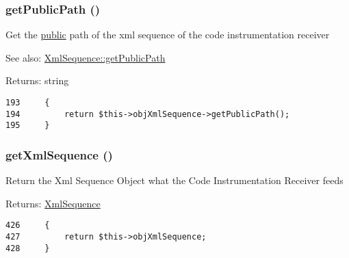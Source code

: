 \hypertarget{class_code_instrumentation_receiver_74df99a19bc54d630a15e1778144eb31}{
\subsubsection[{getPublicPath}]{\setlength{\rightskip}{0pt plus 5cm}getPublicPath ()}}
\label{class_code_instrumentation_receiver_74df99a19bc54d630a15e1778144eb31}


Get the \hyperlink{namespacepublic}{public} path of the xml sequence of the code instrumentation receiver

\begin{Desc}
\item[See also:]\hyperlink{class_xml_sequence_74df99a19bc54d630a15e1778144eb31}{XmlSequence::getPublicPath} \end{Desc}
\begin{Desc}
\item[Returns:]string \end{Desc}


\begin{Code}\begin{verbatim}193     {
194         return $this->objXmlSequence->getPublicPath();  
195     }
\end{verbatim}
\end{Code}


\hypertarget{class_code_instrumentation_receiver_feb0ab0d5955fcae20ff5062fa59fd79}{
\subsubsection[{getXmlSequence}]{\setlength{\rightskip}{0pt plus 5cm}getXmlSequence ()}}
\label{class_code_instrumentation_receiver_feb0ab0d5955fcae20ff5062fa59fd79}


Return the Xml Sequence Object what the Code Instrumentation Receiver feeds

\begin{Desc}
\item[Returns:]\hyperlink{class_xml_sequence}{XmlSequence} \end{Desc}


\begin{Code}\begin{verbatim}426     {
427         return $this->objXmlSequence;
428     }
\end{verbatim}
\end{Code}


